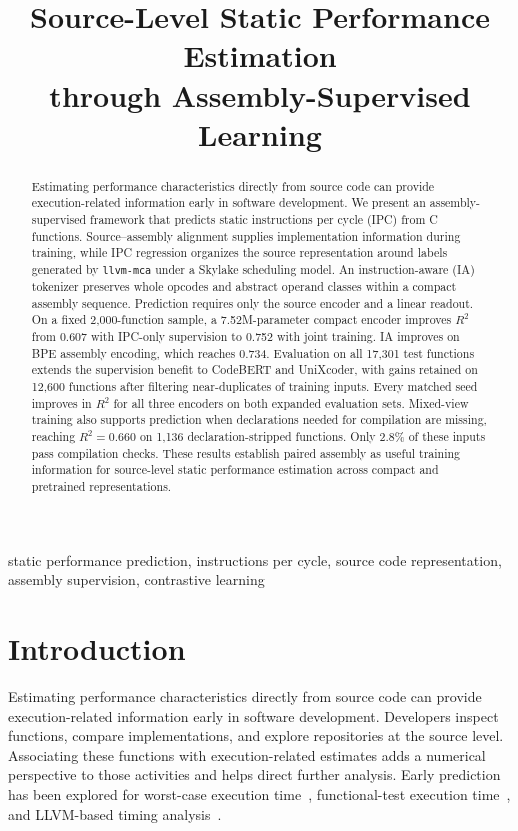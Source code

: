 \documentclass[conference]{IEEEtran}
\newcommand{\llvmmca}{\texttt{llvm-mca}}
\newcommand{\Rsq}{R^{2}}
\begin{document}
\title{Source-Level Static Performance Estimation\\through Assembly-Supervised Learning}
\author{
}
\maketitle

\begin{abstract}
Estimating performance characteristics directly from source code can provide execution-related information early in software development. We present an assembly-supervised framework that predicts static instructions per cycle (IPC) from C functions. Source--assembly alignment supplies implementation information during training, while IPC regression organizes the source representation around labels generated by \llvmmca{} under a Skylake scheduling model. An instruction-aware (IA) tokenizer preserves whole opcodes and abstract operand classes within a compact assembly sequence. Prediction requires only the source encoder and a linear readout. On a fixed 2,000-function sample, a 7.52M-parameter compact encoder improves $\Rsq$ from 0.607 with IPC-only supervision to 0.752 with joint training. IA improves on BPE assembly encoding, which reaches 0.734. Evaluation on all 17,301 test functions extends the supervision benefit to CodeBERT and UniXcoder, with gains retained on 12,600 functions after filtering near-duplicates of training inputs. Every matched seed improves in $\Rsq$ for all three encoders on both expanded evaluation sets. Mixed-view training also supports prediction when declarations needed for compilation are missing, reaching $\Rsq=0.660$ on 1,136 declaration-stripped functions. Only 2.8\% of these inputs pass compilation checks. These results establish paired assembly as useful training information for source-level static performance estimation across compact and pretrained representations.
\end{abstract}

\begin{IEEEkeywords}
static performance prediction, instructions per cycle, source code representation, assembly supervision, contrastive learning
\end{IEEEkeywords}

\section{Introduction}
Estimating performance characteristics directly from source code can provide execution-related information early in software development. Developers inspect functions, compare implementations, and explore repositories at the source level. Associating these functions with execution-related estimates adds a numerical perspective to those activities and helps direct further analysis. Early prediction has been explored for worst-case execution time~\cite{bonenfant2017wcet}, functional-test execution time~\cite{samoaa2022tep}, and LLVM-based timing analysis~\cite{xu2025preti}.
\end{document}

